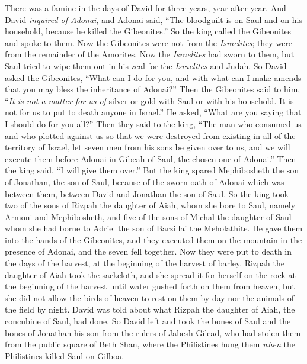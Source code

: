 \begin{biblechapter} %
 There was a famine in the days of David for three years, year after year. And David \textit{inquired of Adonai}, and Adonai said, “The bloodguilt is on Saul and on his household, because he killed the Gibeonites.”
\verse So the king called the Gibeonites and spoke to them. Now the Gibeonites were not from the \textit{Israelites}; they were from the remainder of the Amorites. Now the \textit{Israelites} had sworn to them, but Saul tried to wipe them out in his zeal for the \textit{Israelites} and Judah.
\verse So David asked the Gibeonites, “What can I do for you, and with what can I make amends that you may bless the inheritance of Adonai?”
\verse Then the Gibeonites said to him, “\textit{It is not a matter for us of} silver or gold with Saul or with his household. It is not for us to put to death anyone in Israel.” He asked, “What are you saying that I should do for you all?”
\verse Then they said to the king, “The man who consumed us and who plotted against us so that we were destroyed from existing in all of the territory of Israel,
\verse let seven men from his sons be given over to us, and we will execute them before Adonai in Gibeah of Saul, the chosen one of Adonai.” Then the king said, “I will give them over.”
\verse But the king spared Mephibosheth the son of Jonathan, the son of Saul, because of the sworn oath of Adonai which was between them, between David and Jonathan the son of Saul.
\verse So the king took two of the sons of Rizpah the daughter of Aiah, whom she bore to Saul, namely Armoni and Mephibosheth, and five of the sons of Michal the daughter of Saul whom she had borne to Adriel the son of Barzillai the Meholathite.
\verse He gave them into the hands of the Gibeonites, and they executed them on the mountain in the presence of Adonai, and the seven fell together. Now they were put to death in the days of the harvest, at the beginning of the harvest of barley.
\verse Rizpah the daughter of Aiah took the sackcloth, and she spread it for herself on the rock at the beginning of the harvest until water gushed forth on them from heaven, but she did not allow the birds of heaven to rest on them by day nor the animals of the field by night.
\verse David was told about what Rizpah the daughter of Aiah, the concubine of Saul, had done.
\verse So David left and took the bones of Saul and the bones of Jonathan his son from the rulers of Jabesh Gilead, who had stolen them from the public square of Beth Shan, where the Philistines hung them \textit{when} the Philistines killed Saul on Gilboa.

\end{biblechapter}
